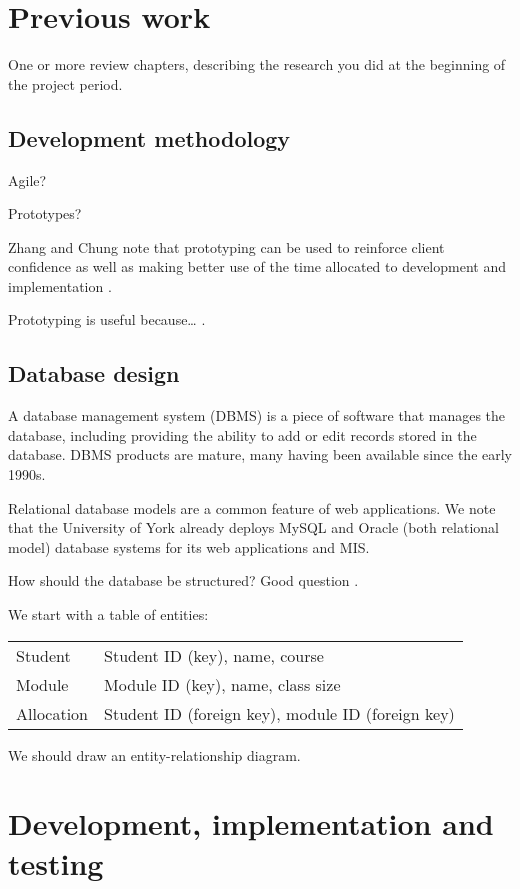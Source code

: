 \documentclass[]{article}
\begin{document}
\section{Previous work}

One or more review chapters, describing the research you did at the beginning of the project period.

\subsection{Development methodology}

Agile?

Prototypes?

Zhang and Chung note that prototyping can be used to reinforce client confidence as well as making better use of the time allocated to development and implementation \cite{MODFM_2003}.

Prototyping is useful because… \cite{PrototypingWebApplications_2000}.

\subsection{Database design}

A database management system (DBMS) is a piece of software that manages the database, including providing the ability to add or edit records stored in the database. DBMS products are mature, many having been available since the early 1990s.

Relational database models are a common feature of web applications. We note that the University of York already deploys MySQL and Oracle (both relational model) database systems for its web applications and MIS.

How should the database be structured? Good question \cite{DatabaseModelsLanguagesDesign}.

We start with a table of entities:

\begin{tabular}{ l l }
  Student    & Student ID (key), name, course \\
  Module     & Module ID (key), name, class size \\
  Allocation & Student ID (foreign key), module ID (foreign key) \\
\end{tabular}

We should draw an entity-relationship diagram.

\section{Development, implementation and testing}
\end{document}
